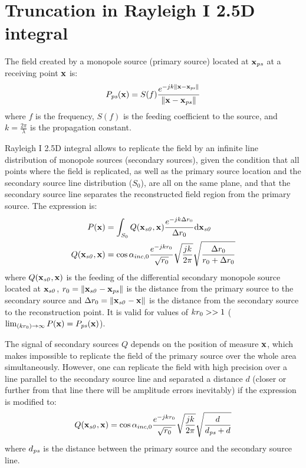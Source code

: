 \chapter{Truncation in Rayleigh I 2.5D integral}

The field created by a monopole source (primary source) located at $\PosTheo[primarySource]$ at a receiving point $\PosTheo$ is:
\begin{equation}
P_{\PosTheoSubInd[primarySource]}(\PosTheo) = S(f)  \frac{e^{-jk\norm{\PosTheo - \PosTheo[primarySource]}}}{\norm{\PosTheo - \PosTheo[primarySource]}}
\end{equation}
where $f$ is the frequency, $S(f)$ is the feeding coefficient to the source, and $k = \frac{2\pi}{\lambda}$ is the propagation constant.

Rayleigh I 2.5D integral allows to replicate the field by an infinite line distribution of monopole sources (secondary sources), given the condition that all points where the field is replicated, as well as the primary source location and the secondary source line distribution ($S_0$), are all on the same plane, and that the secondary source line separates the reconstructed field region from the primary source. The expression is:
\begin{equation}
\begin{aligned}
P(\PosTheo) &= \int_{S_0} Q(\PosTheo[section], \PosTheo) \frac{e^{-jk\distLinePoint}}{\distLinePoint} \mathrm{d}\PosTheo[section]\\
Q(\PosTheo[section], \PosTheo) &= \cos\normPrimaryPropAngleSection \frac{e^{-jk\distLinePrimSource}}{\sqrt{\distLinePrimSource}} \sqrt{\frac{j k}{2\pi}} \sqrt{\frac{\distLinePoint}{\distLinePrimSource + \distLinePoint}}
\end{aligned}
\end{equation}
where $Q(\PosTheo[section], \PosTheo)$ is the feeding of the differential secondary monopole source located at $\PosTheo[section]$, $\distLinePrimSource = \norm{\PosTheo[section] - \PosTheo[primarySource]}$ is the distance from the primary source to the secondary source and $\distLinePoint = \norm{\PosTheo[section] - \PosTheo}$ is the distance from the secondary source to the reconstruction point. It is valid for values of $kr_0 >> 1$ ($\lim_{(k\distLinePrimSource) \to \infty} P(\PosTheo) = P_{\PosTheoSubInd[primarySource]}(\PosTheo)$).

The signal of secondary sources $Q$ depends on the position of measure $\PosTheo$, which makes impossible to replicate the field of the primary source over the whole area simultaneously. However, one can replicate the field with high precision over a line parallel to the secondary source line and separated a distance $d$ (closer or further from that line there will be amplitude errors inevitably) if the expression is modified to:
\begin{equation}
Q(\PosTheo[section], \PosTheo) = \cos\normPrimaryPropAngleSection \frac{e^{-jk\distLinePrimSource}}{\sqrt{\distLinePrimSource}} \sqrt{\frac{j k}{2\pi}} \sqrt{\frac{d}{d_{\PosTheoSubInd[primarySource]} + d}}
\end{equation}
where $d_{\PosTheoSubInd[primarySource]}$ is the distance between the primary source and the secondary source line.

